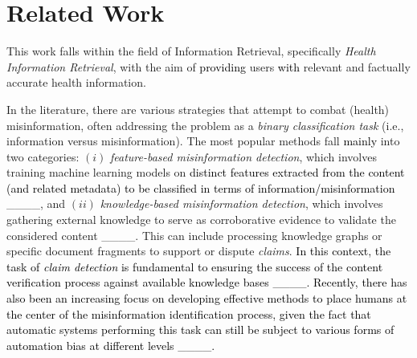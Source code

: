 \section{Related Work}
\label{sec:relatedwork}

This work falls within the field of Information Retrieval, specifically \textit{Health Information Retrieval}, with the aim of \textcolor{black}{providing} users \textcolor{black}{with} relevant and factually accurate health information. 

In the literature, there are various strategies that attempt to combat (health) misinformation, often addressing the problem as a \textit{binary classification task} (i.e., information versus misinformation).
The most popular methods %
fall \textcolor{black}{mainly} into two categories: $(i)$ \textit{feature-based misinformation detection}, which involves training machine learning models on \textcolor{black}{distinct features extracted from the content (and related metadata) to be classified in terms of information/misinformation} ____, and $(ii)$ \textit{knowledge-based misinformation detection}, which involves gathering external knowledge to serve as corroborative evidence to validate the considered content ____. This can include processing knowledge graphs or specific document fragments to support or dispute \textit{claims}. \textcolor{black}{In this context, the task of \textit{claim detection} is fundamental to ensuring the success of the content verification process against available knowledge bases ____. Recently, there has also been an increasing focus on developing effective methods to place humans at the center of the misinformation identification process, \textcolor{black}{given the fact that automatic systems performing this task can still be subject to various forms of automation bias at different levels ____.}}


